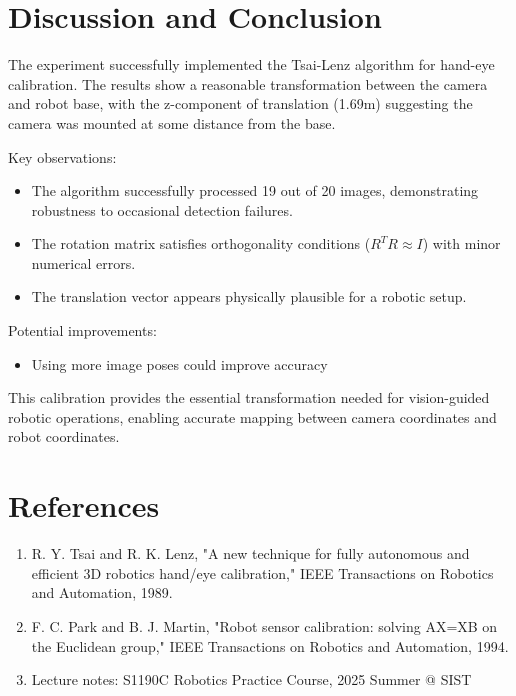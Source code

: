 \documentclass{article}
\begin{document}
\section{Discussion and Conclusion}
The experiment successfully implemented the Tsai-Lenz algorithm for hand-eye calibration. The results show a reasonable transformation between the camera and robot base, with the z-component of translation (1.69m) suggesting the camera was mounted at some distance from the base.

Key observations:
\begin{itemize}
\item The algorithm successfully processed 19 out of 20 images, demonstrating robustness to occasional detection failures.
\item The rotation matrix satisfies orthogonality conditions ($R^T R \approx I$) with minor numerical errors.
\item The translation vector appears physically plausible for a robotic setup.
\end{itemize}

Potential improvements:
\begin{itemize}
\item Using more image poses could improve accuracy
\end{itemize}

This calibration provides the essential transformation needed for vision-guided robotic operations, enabling accurate mapping between camera coordinates and robot coordinates.

\section*{References}
\begin{enumerate}
\item R. Y. Tsai and R. K. Lenz, "A new technique for fully autonomous and efficient 3D robotics hand/eye calibration," IEEE Transactions on Robotics and Automation, 1989.
\item F. C. Park and B. J. Martin, "Robot sensor calibration: solving AX=XB on the Euclidean group," IEEE Transactions on Robotics and Automation, 1994.
\item Lecture notes: S1190C Robotics Practice Course, 2025 Summer @ SIST
\end{enumerate}
\end{document}
